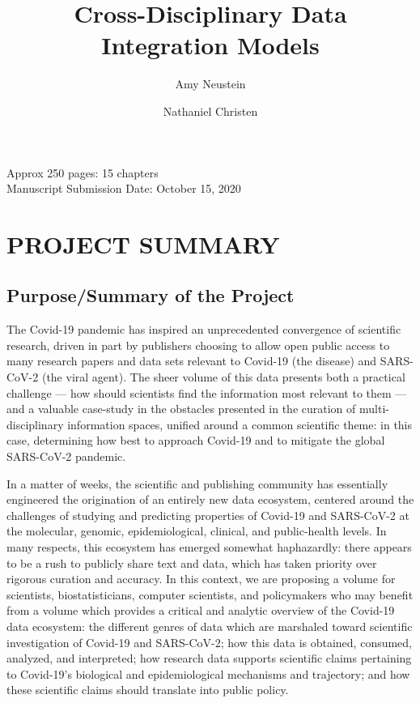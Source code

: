 \documentclass{statsoc}
\title[Cross-Disciplinary Data Integration for Covid-19]{Cross-Disciplinary Data Integration Models \\\makebox{for the New Covid-19 Data Ecosystem}}
\author[Amy Neustein]{Amy Neustein}
\author[Amy Neustein]{Nathaniel Christen}
\newcommand{\p}[1]{

\vspace{.75em}#1}
\begin{document}
\vspace{1em}
\noindent{}Approx 250 pages: 15 chapters\\
Manuscript Submission Date: October 15, 2020\\

{\fontsize{10}{14}\selectfont
\section{PROJECT SUMMARY}

\subsection{Purpose/Summary of the Project}
\p{The Covid-19 pandemic has inspired an unprecedented 
convergence of scientific research, driven in part 
by publishers choosing to allow open public access 
to many research papers and data sets 
relevant to Covid-19 (the disease) and SARS-CoV-2 
(the viral agent).  The sheer volume of this data 
presents both a practical challenge --- how should 
scientists find the information most relevant to them 
--- and a valuable case-study in the obstacles presented 
in the curation of multi-disciplinary 
information spaces, unified around a common 
scientific theme: in this case, 
determining how best to approach Covid-19 and to 
mitigate the global SARS-CoV-2 pandemic.}

\p{In a matter of weeks, the scientific and publishing 
community has essentially engineered the origination of 
an entirely new data ecosystem, centered around the 
challenges of studying and predicting properties 
of Covid-19 and SARS-CoV-2 at the molecular, genomic, 
epidemiological, clinical, and public-health levels.  
In many respects, this ecosystem has emerged somewhat 
haphazardly: there appears to be a rush to publicly 
share text and data, which has taken priority over 
rigorous curation and accuracy.  In this context, 
we are proposing a volume for scientists, 
biostatisticians, computer 
scientists, and policymakers who may benefit from a 
volume which provides a critical and analytic 
overview of the Covid-19 data ecosystem: the 
different genres of data which are marshaled 
toward scientific investigation of Covid-19 
and SARS-CoV-2; how this data is obtained, 
consumed, analyzed, and interpreted; how 
research data supports scientific claims 
pertaining to Covid-19's biological and 
epidemiological mechanisms and trajectory; 
and how these scientific claims should 
translate into public policy.} 

}
\end{document}
